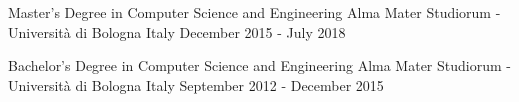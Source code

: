 

\begin{cventries}

  \cventry
    {Master's Degree in Computer Science and Engineering} %
    {Alma Mater Studiorum - Università di Bologna} %
    {Italy} %
    {December 2015 - July 2018} %
    {}
   
    
  \cventry
	{Bachelor's Degree in Computer Science and Engineering} %
	{Alma Mater Studiorum - Università di Bologna} %
	{Italy} %
	{September 2012 - December 2015} %
	{}

%




\end{cventries}
